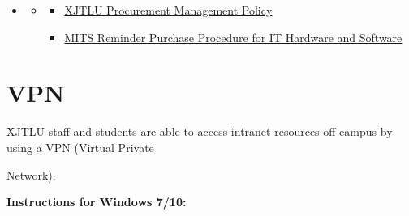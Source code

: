 \documentclass[
]{book}
\providecommand{\tightlist}{%
  \setlength{\itemsep}{0pt}\setlength{\parskip}{0pt}}
\newenvironment{rmdblock}[1]
  {\begin{shaded*}
  \begin{itemize}
  \renewcommand{\labelitemi}{
    \raisebox{-.7\height}[0pt][0pt]{
      {\setkeys{Gin}{width=2em,keepaspectratio}\texttt{[image: image/\#1]}}
    }
  }
  \item
  }
  {
  \end{itemize}
  \end{shaded*}
  }
\newenvironment{rmdrd}
  {\begin{rmdblock}{rd}}
  {\end{rmdblock}}
\begin{document}
\begin{rmdrd}
\begin{rmdrd}

\begin{itemize}
\tightlist
\item
  \href{https://box.xjtlu.edu.cn/lib/883faf64-eff0-432e-8426-462815438e4c/file/UC/UC\%20for\%20Staff/201910/Notice/Procurement\%20Management\%20Policy.pdf}{XJTLU Procurement Management Policy}
\item
  \href{https://box.xjtlu.edu.cn/smart-link/985f3f45-5d2c-4aff-8b83-0f117692e508/}{MITS Reminder Purchase Procedure for IT Hardware and Software}
\end{itemize}

\end{rmdrd}
\end{rmdrd}

\hypertarget{vpn}{%
\section{VPN}\label{vpn}}

XJTLU staff and students are able to access intranet resources off-campus by using a VPN (Virtual Private

Network).

\textbf{Instructions for Windows 7/10:}
\end{document}
